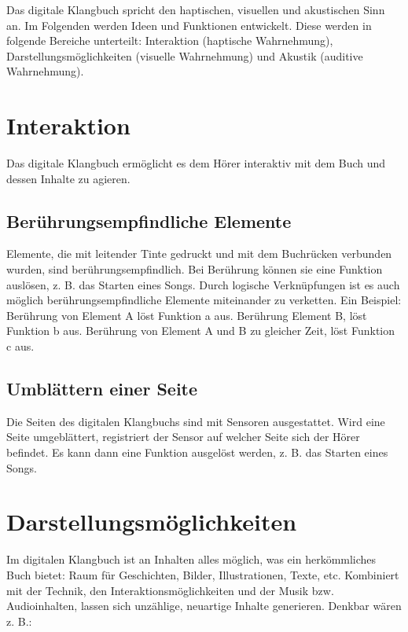 Das digitale Klangbuch spricht den haptischen, visuellen und akustischen Sinn an. Im Folgenden werden Ideen und Funktionen entwickelt. Diese werden in folgende Bereiche unterteilt: Interaktion (haptische Wahrnehmung), Darstellungsmöglichkeiten (visuelle Wahrnehmung) und Akustik (auditive Wahrnehmung).


\section{Interaktion}
Das digitale Klangbuch ermöglicht es dem Hörer interaktiv mit dem Buch und dessen Inhalte zu agieren.

\subsection{Berührungsempfindliche Elemente}
Elemente, die mit leitender Tinte gedruckt und mit dem Buchrücken verbunden wurden, sind berührungsempfindlich. Bei Berührung können sie eine Funktion auslösen, z. B. das Starten eines Songs. Durch logische Verknüpfungen ist es auch möglich berührungsempfindliche Elemente miteinander zu verketten. Ein Beispiel: Berührung von Element A löst Funktion a aus. Berührung Element B, löst Funktion b aus. Berührung von Element A und B zu gleicher Zeit, löst Funktion c aus.

\subsection{Umblättern einer Seite}
Die Seiten des digitalen Klangbuchs sind mit Sensoren ausgestattet. Wird eine Seite umgeblättert, registriert der Sensor auf welcher Seite sich der Hörer befindet. Es kann dann eine Funktion ausgelöst werden, z. B. das Starten eines Songs.



\section{Darstellungsmöglichkeiten}

Im digitalen Klangbuch ist an Inhalten alles möglich, was ein herkömmliches Buch bietet: Raum für Geschichten, Bilder, Illustrationen, Texte, etc. Kombiniert mit der Technik, den Interaktionsmöglichkeiten und der Musik bzw. Audioinhalten, lassen sich unzählige, neuartige Inhalte generieren. Denkbar wären z. B.:

